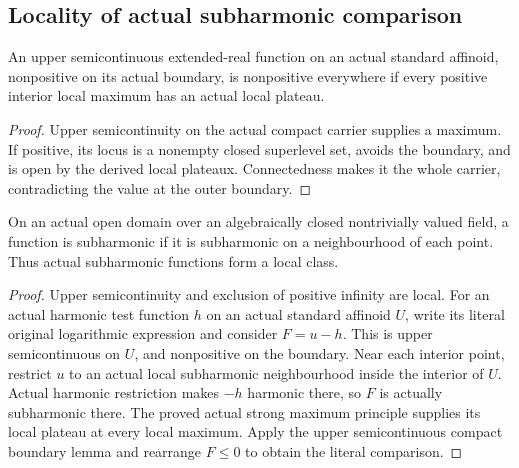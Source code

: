\subsection{Locality of actual subharmonic comparison}\label{subsec:fc-line-subharmonic-locality}

\begin{lemma}\label{lem:fc-line-usc-boundary-comparison}
\leanok
{}
An upper semicontinuous extended-real function on an actual standard
affinoid, nonpositive on its actual boundary, is nonpositive everywhere
if every positive interior local maximum has an actual local plateau.
\end{lemma}

\begin{proof}
Upper semicontinuity on the actual compact carrier supplies a maximum.
If positive, its locus is a nonempty closed superlevel set, avoids the
boundary, and is open by the derived local plateaux. Connectedness makes
it the whole carrier, contradicting the value at the outer boundary.
\end{proof}

\begin{theorem}\label{thm:fc-line-subharmonic-locality}
\leanok
{}
On an actual open domain over an algebraically closed nontrivially valued
field, a function is subharmonic if it is subharmonic on a neighbourhood
of each point. Thus actual subharmonic functions form a local class.
\end{theorem}

\begin{proof}
Upper semicontinuity and exclusion of positive infinity are local.
For an actual harmonic test function $h$ on an actual standard affinoid
$U$, write its literal original logarithmic expression and consider
$F=u-h$. This is upper semicontinuous on $U$, and nonpositive on the
boundary. Near each interior point, restrict $u$ to an actual local
subharmonic neighbourhood inside the interior of $U$. Actual harmonic
restriction makes $-h$ harmonic there, so $F$ is actually subharmonic
there. The proved actual strong maximum principle supplies its local
plateau at every local maximum. Apply the upper semicontinuous compact
boundary lemma and rearrange $F\le0$ to obtain the literal comparison.
\end{proof}
